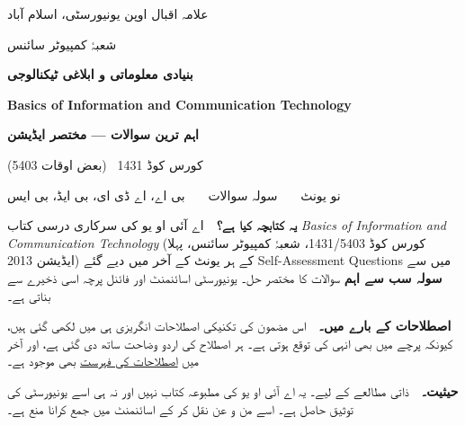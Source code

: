\thispagestyle{empty}


\vspace*{0.9cm}
{\color{bmink}
  {\large علامہ اقبال اوپن یونیورسٹی، اسلام آباد}\par
  \vspace{3pt}
  {شعبۂ کمپیوٹر سائنس}\par
  \vspace{18pt}
  {\Huge\bfseries\color{bmblue} بنیادی معلوماتی و ابلاغی ٹیکنالوجی}\par
  \vspace{5pt}
  {\large\bfseries \textenglish{Basics of Information and Communication Technology}}\par
  \vspace{10pt}
  {\LARGE\bfseries اہم ترین سوالات --- مختصر ایڈیشن}\par
  \vspace{12pt}
  {\large کورس کوڈ \textenglish{1431} \ (بعض اوقات \textenglish{5403})}\par
  \vspace{4pt}
  {نو یونٹ \ \textbullet\ \ سولہ سوالات \ \textbullet\ \ بی اے، اے ڈی ای، بی ایڈ، بی ایس\par}
}

\vspace{1.0cm}

\begin{tcolorbox}[enhanced, colback=white, colframe=bmblue, boxrule=0.6pt,
                  arc=3pt, left=12pt, right=12pt, top=10pt, bottom=10pt]
\textbf{\color{bmblue}یہ کتابچہ کیا ہے؟}\ \
اے آئی او یو کی سرکاری درسی کتاب \textenglish{\emph{Basics of Information and
Communication Technology}} (کورس کوڈ \textenglish{1431/5403}، شعبۂ کمپیوٹر
سائنس، پہلا ایڈیشن \textenglish{2013}) کے ہر یونٹ کے آخر میں دیے گئے
\textenglish{Self-Assessment Questions} میں سے \textbf{سولہ سب سے اہم} سوالات
کا مختصر حل۔ یونیورسٹی اسائنمنٹ اور فائنل پرچہ اسی ذخیرے سے بناتی ہے۔

\medskip
\textbf{\color{bmblue}اصطلاحات کے بارے میں۔}\ \
اس مضمون کی تکنیکی اصطلاحات انگریزی ہی میں لکھی گئی ہیں، کیونکہ پرچے میں بھی
انہی کی توقع ہوتی ہے۔ ہر اصطلاح کی اردو وضاحت ساتھ دی گئی ہے، اور آخر میں
\hyperref[sec:lughat]{اصطلاحات کی فہرست} بھی موجود ہے۔

\medskip
\textbf{\color{bmblue}حیثیت۔}\ \
ذاتی مطالعے کے لیے۔ یہ اے آئی او یو کی مطبوعہ کتاب نہیں اور نہ ہی اسے یونیورسٹی
کی توثیق حاصل ہے۔ اسے من و عن نقل کر کے اسائنمنٹ میں جمع کرانا منع ہے۔
\end{tcolorbox}

